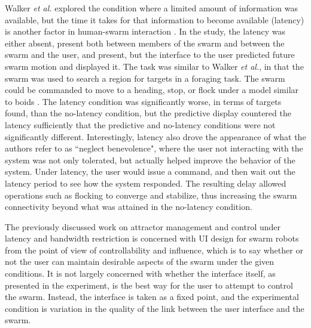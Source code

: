 Walker \emph{et al.} explored the condition where a limited amount of information was available, but the time it takes for that information to become available (latency) is another factor in human-swarm interaction \citep{walker2012neglect}.
In the study, the latency was either absent, present both between members of the swarm and between the swarm and the user, and present, but the interface to the user predicted future swarm motion and displayed it. 
The task was similar to Walker \emph{et al.}, in that the swarm was used to search a region for targets in a foraging task. 
The swarm could be commanded to move to a heading, stop, or flock under a model similar to boids \citep{reynolds1987flocks}.
The latency condition was significantly worse, in terms of targets found, than the no-latency condition, but the predictive display countered the latency sufficiently that the predictive and no-latency conditions were not significantly different. 
Interestingly, latency also drove the appearance of what the authors refer to as ``neglect benevolence", where the user not interacting with the system was not only tolerated, but actually helped improve the behavior of the system. 
Under latency, the user would issue a command, and then wait out the latency period to see how the system responded.
The resulting delay allowed operations such as flocking to converge and stabilize, thus increasing the swarm connectivity beyond what was attained in the no-latency condition. 

The previously discussed work on attractor management and control under latency and bandwidth restriction is concerned with UI design for swarm robots from the point of view of controllability and influence, which is to say whether or not the user can maintain desirable aspects of the swarm under the given conditions. 
It is not largely concerned with whether the interface itself, as presented in the experiment, is the best way for the user to attempt to control the swarm.
Instead, the interface is taken as a fixed point, and the experimental condition is variation in the quality of the link between the user interface and the swarm. 

